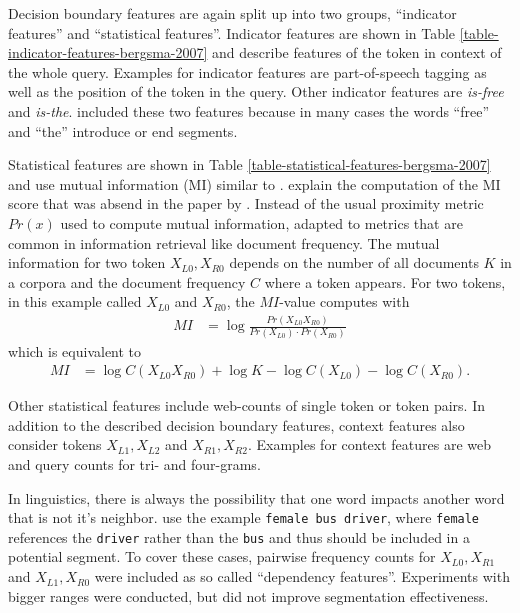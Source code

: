 

Decision boundary features are again split up into two groups, ``indicator features'' and ``statistical features''. Indicator features are shown in Table \ref{table-indicator-features-bergsma-2007} and describe features of the token in context of the whole query. Examples for indicator features are part-of-speech tagging as well as the position of the token in the query. Other indicator features are \textit{is-free} and \textit{is-the}. \citeauthor{Bergsma:2007} included these two features because in many cases the words ``free'' and ``the'' introduce or end segments.



Statistical features are shown in Table \ref{table-statistical-features-bergsma-2007} and use mutual information (MI) similar to \citeauthor{Risvik:2003}. \citeauthor{Bergsma:2007} explain the computation of the MI score that was absend in the paper by \citeauthor{Risvik:2003}.
Instead of the usual proximity metric $Pr(x)$ used to compute mutual information, \citeauthor{Bergsma:2007} adapted to metrics that are common in information retrieval like document frequency. The mutual information for two token $X_{L0},X_{R0}$ depends on the number of all documents $K$ in a corpora and the document frequency $C$ where a token appears. 
For two tokens, in this example called $X_{L0}$ and $X_{R0}$, the $MI$-value computes with
\begin{align*}
MI &= \log \frac{Pr(X_{L0}X_{R0})}{Pr(X_{L0}) \cdot Pr(X_{R0})}
\end{align*}
which is equivalent to
\begin{align*}
MI &=\log C(X_{L0}X_{R0}) + \log K - \log C(X_{L0}) - \log C(X_{R0}).
\end{align*}

Other statistical features include web-counts of single token or token pairs. In addition to the described decision boundary features, context features also consider tokens $X_{L1}, X_{L2}$ and $X_{R1}, X_{R2}$. Examples for context features are web and query counts for tri- and four-grams.

In linguistics, there is always the possibility that one word impacts another word that is not it's neighbor. \citeauthor{Bergsma:2007} use the example \texttt{female bus driver}, where \texttt{female} references the \texttt{driver} rather than the \texttt{bus} and thus should be included in a potential segment. To cover these cases, pairwise frequency counts for $X_{L0},X_{R1}$ and $X_{L1},X_{R0}$ were included as so called ``dependency features''. Experiments with bigger ranges were conducted, but did not improve segmentation effectiveness.\\

